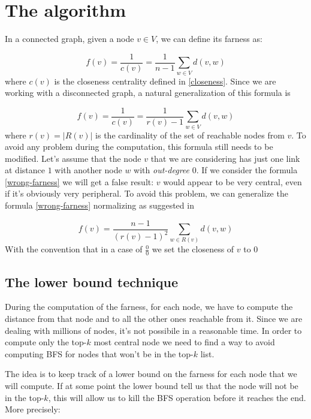\section{The algorithm}

In a connected graph, given a node $v \in V$, we can define its farness as:

\begin{equation}
    f(v) = \frac{1}{c(v)} = \frac{1}{n-1} \displaystyle \sum_{w \in V} d(v,w)
\end{equation}
where $c(v)$ is the closeness centrality defined in \eqref{closeness}. Since we are working with a disconnected graph, a natural generalization of this formula is

\begin{equation}\label{wrong-farness}
    f(v) = \frac{1}{c(v)} = \frac{1}{r(v)-1} \displaystyle \sum_{w \in V} d(v,w)
\end{equation}
where $r(v) = |R(v)|$ is the cardinality of the set of reachable nodes from $v$. To avoid any problem during the computation, this formula still needs to be modified. Let's assume that the node $v$ that we are considering has just one link at distance $1$ with another node $w$ with \emph{out-degree} 0. If we consider the formula \eqref{wrong-farness} we will get a false result: $v$ would appear to be very central, even if it's obviously very peripheral. To avoid this problem, we can generalize the formula \eqref{wrong-farness} normalizing as suggested in \cite{wasserman_faust_1994,doi:10.1080/15427951.2013.865686, olsen2014upoa}

\begin{equation}\label{farness}
    f(v) = \frac{n-1}{(r(v)-1)^2} \sum_{w \in R(v)} d(v,w)
\end{equation}
With the convention that in a case of $\frac{0}{0}$ we set the closeness of $v$ to 0

\subsection{The lower bound technique}
During the computation of the farness, for each node, we have to compute the distance from that node and to all the other ones reachable from it. Since we are dealing with millions of nodes, it's not possibile in a reasonable time. In order to compute only the top-$k$ most central node we need to find a way to avoid computing BFS for nodes that won't be in the top-$k$ list. \s

\noindent The idea is to keep track of a lower bound on the farness for each node that we will compute. If at some point the lower bound tell us that the node will not be in the top-$k$, this will allow us to kill the BFS operation before it reaches the end. More precisely:

